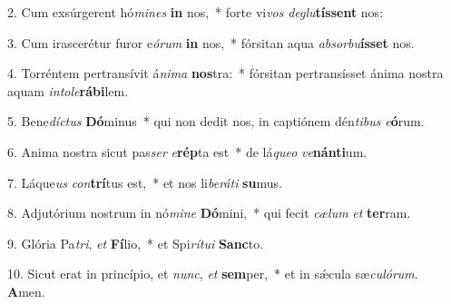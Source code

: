 2. Cum exsúrgerent hó\textit{mi}\textit{nes} \textbf{in} nos,~*  forte vi\textit{vos} \textit{de}\textit{glu}\textbf{tís}\textbf{sent} nos:\

3. Cum irascerétur furor e\textit{ó}\textit{rum} \textbf{in} nos,~*  fórsitan aqua \textit{ab}\textit{sor}\textit{bu}\textbf{ís}\textbf{set} nos.\

4. Torréntem pertransívit á\textit{ni}\textit{ma} \textbf{nos}tra:~*  fórsitan pertransísset ánima nostra aquam \textit{in}\textit{to}\textit{le}\textbf{rá}\textbf{bi}lem.\

5. Bene\textit{díc}\textit{tus} \textbf{Dó}minus~*  qui non dedit nos, in captiónem dén\textit{ti}\textit{bus} \textit{e}\textbf{ó}rum.\

6. Anima nostra sicut pas\textit{ser} \textit{e}\textbf{rép}ta est~*  de lá\textit{que}\textit{o} \textit{ve}\textbf{nán}\textbf{ti}um.\

7. Láque\textit{us} \textit{con}\textbf{trí}tus est,~*  et nos li\textit{be}\textit{rá}\textit{ti} \textbf{su}mus.\

8. Adjutórium nostrum in nó\textit{mi}\textit{ne} \textbf{Dó}mini,~*  qui fecit \textit{cæ}\textit{lum} \textit{et} \textbf{ter}ram.\

9. Glória Pa\textit{tri}, \textit{et} \textbf{Fí}lio,~*  et Spi\textit{rí}\textit{tu}\textit{i} \textbf{Sanc}to.\

10. Sicut erat in princípio, et \textit{nunc}, \textit{et} \textbf{sem}per,~*  et in sǽcula sæ\textit{cu}\textit{ló}\textit{rum}. \textbf{A}men.\

